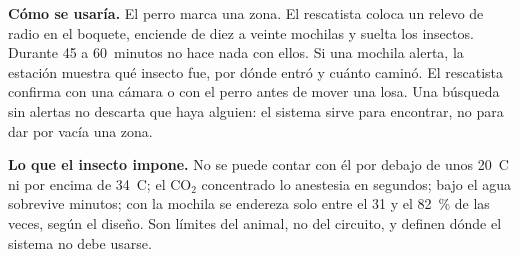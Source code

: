 \textbf{Cómo se usaría.} El perro marca una zona. El rescatista coloca un relevo de radio en el
boquete, enciende de diez a veinte mochilas y suelta los insectos. Durante 45 a 60~minutos no hace
nada con ellos. Si una mochila alerta, la estación muestra qué insecto fue, por dónde entró y cuánto
caminó. El rescatista confirma con una cámara o con el perro antes de mover una losa. Una búsqueda
sin alertas no descarta que haya alguien: el sistema sirve para encontrar, no para dar por vacía una zona.

\textbf{Lo que el insecto impone.} No se puede contar con él por debajo de unos 20~\textdegree C ni por
encima de 34~\textdegree C; el CO$_2$ concentrado lo anestesia en segundos; bajo el agua sobrevive
minutos; con la mochila se endereza solo entre el 31 y el 82~\% de las veces, según el diseño. Son límites del
animal, no del circuito, y definen dónde el sistema no debe usarse.
